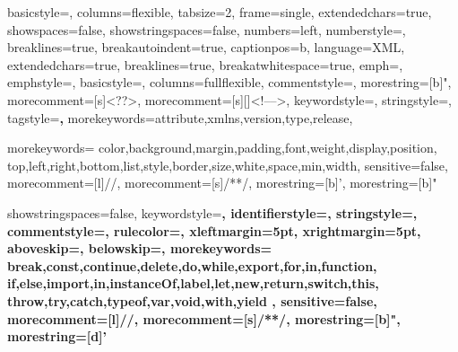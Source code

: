 
 {
    basicstyle=\footnotesize,
    columns=flexible,
    tabsize=2,
    frame=single,
    extendedchars=true,
    showspaces=false,
    showstringspaces=false,
    numbers=left,
    numberstyle=\tiny,
    breaklines=true,
    breakautoindent=true,
    captionpos=b,
%
    language=XML,
    extendedchars=true,
    breaklines=true,
    breakatwhitespace=true,
    emph={},
    emphstyle=\color{red},
    basicstyle=\ttfamily,
    columns=fullflexible,
    commentstyle=\color{gray}\upshape,
    morestring=[b]",
    morecomment=[s]{<?}{?>},
    morecomment=[s][\color{forestgreen}]{<!--}{-->},
    keywordstyle=\color{orangered},
    stringstyle=\ttfamily\color{black}\normalfont,
    tagstyle=\color{darkblue}\textbf,
    morekeywords={attribute,xmlns,version,type,release},
}

 {
    morekeywords={
        color,background,margin,padding,font,weight,display,position,
        top,left,right,bottom,list,style,border,size,white,space,min,width},
    sensitive=false,
    morecomment=[l]{//},
    morecomment=[s]{/*}{*/},
    morestring=[b]',
    morestring=[b]"
}

 {
    showstringspaces=false,
    keywordstyle=\ttfamily\bfseries\color{darkblue},
    identifierstyle=\ttfamily,
    stringstyle=\ttfamily\color{forestgreen},
    commentstyle=\color{gray},
    rulecolor=\color{gray},
    xleftmargin=5pt,
    xrightmargin=5pt,
    aboveskip=\bigskipamount,
    belowskip=\bigskipamount,
%
    morekeywords={
        break,const,continue,delete,do,while,export,for,in,function,
        if,else,import,in,instanceOf,label,let,new,return,switch,this,
        throw,try,catch,typeof,var,void,with,yield
    },
    sensitive=false,
    morecomment=[l]{//},
    morecomment=[s]{/*}{*/},
    morestring=[b]",
    morestring=[d]'
}